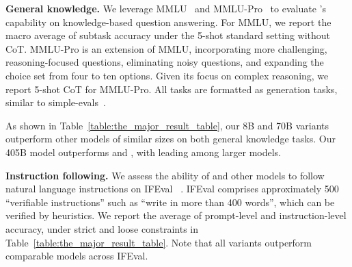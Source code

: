 \textbf{General knowledge.} We leverage MMLU~\citep{hendrycks2021mmlu} and MMLU-Pro~\citep{wang2024mmlu} to evaluate \llamathree's capability on knowledge-based question answering. For MMLU, we report the macro average of subtask accuracy under the 5-shot standard setting without CoT. MMLU-Pro is an extension of MMLU, incorporating more challenging, reasoning-focused questions, eliminating noisy questions, and expanding the choice set from four to ten options. Given its focus on complex reasoning, we report 5-shot CoT for MMLU-Pro. All tasks are formatted as generation tasks, similar to simple-evals~\citep{simpleevals}.

As shown in Table~\ref{table:the_major_result_table}, our 8B and 70B \llamathree variants outperform other models of similar sizes on both general knowledge tasks. Our 405B model outperforms \gptp and \nemotron, with \sonnet leading among larger models.


\textbf{Instruction following.} We assess the ability of \llamathree and other models to follow natural language instructions on IFEval ~\citep{zhou2023instruction}. IFEval comprises approximately 500 ``verifiable instructions'' such as ``write in more than 400 words'', which can be verified by heuristics. We report the average of prompt-level and instruction-level accuracy, under strict and loose constraints in Table~\ref{table:the_major_result_table}. Note that all \llamathree variants outperform comparable models across IFEval.

